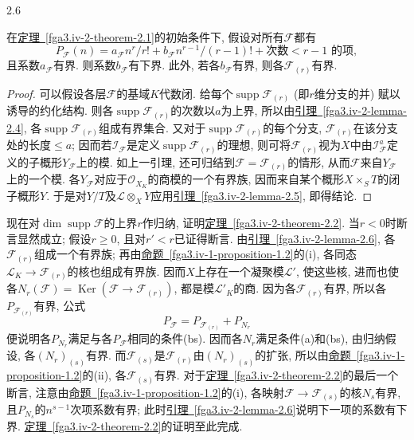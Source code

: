 \begin{lemma}{2.6}\label{fga3.iv-2-lemma-2.6}\skipsinglepar
\par{}在\hyperref[fga3.iv-2-theorem-2.1]{定理~\ref*{fga3.iv-2-theorem-2.1}}的初始条件下, 假设对所有\(\mathscr {F}\)都有\[       P_\mathscr {F}(n)       = a_\mathscr {F} n^r/r! + b_\mathscr {F} n^{r-1}/(r-1)! + \text {次数}<r-1\text { 的项},\] 且系数\(a_\mathscr {F}\)有界. 则系数\(b_\mathscr {F}\)有下界. 此外, 若各\(b_\mathscr {F}\)有界, 则各\(\mathscr {F}_{(r)}\)有界.
\begin{proof}
\par{}可以假设各层\(\mathscr {F}\)的基域\(K\)代数闭. 给每个\(\operatorname {supp}\mathscr {F}_{(r)}\) (即\(r\)维分支的并) 赋以诱导的约化结构. 则各\(\operatorname {supp}\mathscr {F}_{(r)}\)的次数以\(a\)为上界, 所以由\hyperref[fga3.iv-2-lemma-2.4]{引理~\ref*{fga3.iv-2-lemma-2.4}}, 各\(\operatorname {supp}\mathscr {F}_{(r)}\)组成有界集合. 又对于\(\operatorname {supp}\mathscr {F}_{(r)}\)的每个分支, \(\mathscr {F}_{(r)}\)在该分支处的长度\(\leqslant  a\); 因而若\(\mathscr {I}_\mathscr {F}\)是定义\(\operatorname {supp}\mathscr {F}_{(r)}\)的理想, 则可将\(\mathscr {F}_{(r)}\)视为\(X\)中由\(\mathscr {I}_\mathscr {F}^a\)定义的子概形\(Y_\mathscr {F}\)上的模. 如上一引理, 还可归结到\(\mathscr {F}=\mathscr {F}_{(r)}\)的情形, 从而\(\mathscr {F}\)来自\(Y_\mathscr {F}\)上的一个模. 各\(Y_\mathscr {F}\)对应于\(\mathcal {O}_{X_K}\)的商模的一个有界族, 因而来自某个概形\(X\times _S T\)的闭子概形\(Y\). 于是对\(Y/T\)及\(\mathscr {L}\otimes _X Y\)应用\hyperref[fga3.iv-2-lemma-2.5]{引理~\ref*{fga3.iv-2-lemma-2.5}}, 即得结论.
\end{proof}
\end{lemma}
\par{}现在对\(\dim \operatorname {supp}\mathscr {F}\)的上界\(r\)作归纳, 证明\hyperref[fga3.iv-2-theorem-2.2]{定理~\ref*{fga3.iv-2-theorem-2.2}}. 当\(r<0\)时断言显然成立; 假设\(r\geqslant 0\), 且对\(r'<r\)已证得断言. 由\hyperref[fga3.iv-2-lemma-2.6]{引理~\ref*{fga3.iv-2-lemma-2.6}}, 各\(\mathscr {F}_{(r)}\)组成一个有界族; 再由\hyperref[fga3.iv-1-proposition-1.2]{命题~\ref*{fga3.iv-1-proposition-1.2}}的(i), 各同态\(\mathscr {L}_K\to \mathscr {F}_{(r)}\)的核也组成有界族. 因而\(X\)上存在一个凝聚模\(\mathscr {L}'\), 使这些核, 进而也使各\(N_r(\mathscr {F})=\operatorname {Ker}(\mathscr {F}\to \mathscr {F}_{(r)})\), 都是模\(\mathscr {L}'_K\)的商. 因为各\(\mathscr {F}_{(r)}\)有界, 所以各\(P_{\mathscr {F}_{(r)}}\)有界, 公式\[     P_\mathscr {F}     = P_{\mathscr {F}_{(r)}} + P_{N_r}   \]便说明各\(P_{N_r}\)满足与各\(P_\mathscr {F}\)相同的条件(bs). 因而各\(N_r\)满足条件(a)和(bs), 由归纳假设, 各\((N_r)_{(s)}\)有界. 而\(\mathscr {F}_{(s)}\)是\(\mathscr {F}_{(r)}\)由\((N_r)_{(s)}\)的扩张, 所以由\hyperref[fga3.iv-1-proposition-1.2]{命题~\ref*{fga3.iv-1-proposition-1.2}}的(ii), 各\(\mathscr {F}_{(s)}\)有界. 对于\hyperref[fga3.iv-2-theorem-2.2]{定理~\ref*{fga3.iv-2-theorem-2.2}}的最后一个断言, 注意由\hyperref[fga3.iv-1-proposition-1.2]{命题~\ref*{fga3.iv-1-proposition-1.2}}的(i), 各映射\(\mathscr {F}\to \mathscr {F}_{(s)}\)的核\(N_s\)有界, 且\(P_{N_s}\)的\(n^{s-1}\)次项系数有界; 此时\hyperref[fga3.iv-2-lemma-2.6]{引理~\ref*{fga3.iv-2-lemma-2.6}}说明下一项的系数有下界. \hyperref[fga3.iv-2-theorem-2.2]{定理~\ref*{fga3.iv-2-theorem-2.2}}的证明至此完成.
